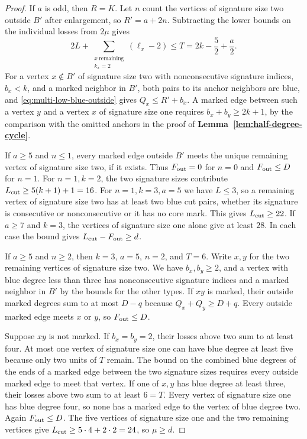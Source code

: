 \documentclass[preprint,11pt,numbers]{elsarticle-arxiv}
\numberwithin{equation}{section}
\theoremstyle{definition}
\begin{document}
\begin{proof}
If $a$ is odd, then $R=K$. Let $n$ count the vertices of
signature size two outside $B'$ after enlargement, so
$R'=a+2n$. Subtracting the lower bounds on the individual
losses from $2\mu$ gives
\begin{equation}\label{eq:multi-small-odd-budget}
 2L+\sum_{\substack{x\ \text{remaining}\\ k_x=2}}(\ell_x-2)
 \le T=2k-\frac{5}{2}+\frac{a}{2} .
\end{equation}
For a vertex $x\notin B'$ of signature size two with
nonconsecutive signature indices, $b_x<k$, and a marked
neighbor in $B'$, both pairs to its anchor neighbors are blue,
and \eqref{eq:multi-low-blue-outside} gives $Q_x\le R'+b_x$.
A marked edge between such a vertex $y$ and a vertex $x$ of
signature size one requires $b_x+b_y\ge2k+1$, by the
comparison with the omitted anchors in the proof of
\textbf{Lemma~\ref{lem:half-degree-cycle}}.

If $a\ge5$ and $n\le1$, every marked edge outside $B'$ meets
the unique remaining vertex of signature size two, if it exists.
Thus $F_{\rm out}=0$ for $n=0$ and $F_{\rm out}\le D$ for $n=1$.
For $n=1,k=2$, the two signature sizes contribute
$L_{\rm cut}\ge5(k+1)+1=16$.
For $n=1,k=3,a=5$ we have $L\le3$, so a remaining vertex
of signature size two has at least two blue cut pairs, whether
its signature is consecutive or nonconsecutive or it has no
core mark. This gives $L_{\rm cut}\ge22$. If $a\ge7$ and
$k=3$, the vertices of signature size one alone give at least
$28$. In each case the bound gives $L_{\rm cut}-F_{\rm out}\ge d$.

If $a\ge5$ and $n\ge2$, then $k=3$, $a=5$, $n=2$, and
$T=6$. Write $x,y$ for the two remaining vertices of signature
size two. We have $b_x,b_y\ge2$, and a vertex with blue degree
less than three has nonconsecutive signature indices and a
marked neighbor in $B'$ by the bounds for the other types.
If $xy$ is marked, their outside marked degrees sum to at most
$D-q$ because $Q_x+Q_y\ge D+q$. Every outside marked edge
meets $x$ or $y$, so $F_{\rm out}\le D$.

Suppose $xy$ is not marked. If $b_x=b_y=2$, their losses above
two sum to at least four. At most one vertex of signature size
one can have blue degree at least five because only two units of
$T$ remain. The bound on the combined blue degrees of the ends
of a marked edge between the two signature sizes requires every
outside marked edge to meet that vertex. If one of $x,y$ has blue
degree at least three, their losses above two sum to at least
$6=T$. Every vertex of signature size one has blue degree four,
so none has a marked edge to the vertex of blue degree two.
Again $F_{\rm out}\le D$. The five vertices of signature size
one and the two remaining vertices give
$L_{\rm cut}\ge5\cdot4+2\cdot2=24$, so $\mu\ge d$.


\end{proof}
\end{document}
